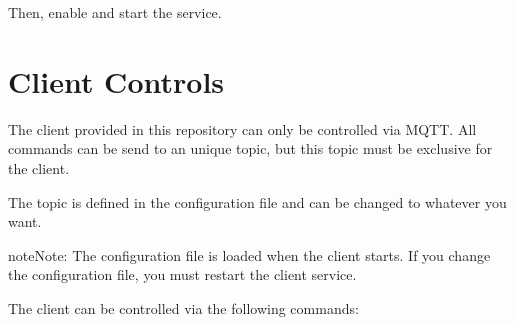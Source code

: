 \documentclass[letterpaper,10pt,english]{sphinxmanual}
\begin{document}
\sphinxAtStartPar
Then, enable and start the service.

\sphinxstepscope


\chapter{Client Controls}
\label{\detokenize{client_guide:client-controls}}\label{\detokenize{client_guide::doc}}
\sphinxAtStartPar
The client provided in this repository can only be controlled via MQTT.
All commands can be send to an unique topic, but this topic must be exclusive for the client.

\sphinxAtStartPar
The topic is defined in the configuration file and can be changed to whatever you want.

\begin{sphinxadmonition}{note}{Note:}
\sphinxAtStartPar
The configuration file is loaded when the client starts.
If you change the configuration file, you must restart
the client service.
\end{sphinxadmonition}

\sphinxAtStartPar
The client can be controlled via the following commands:
\end{document}

